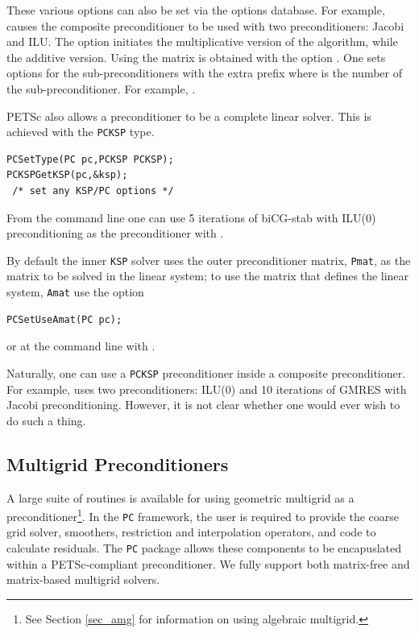 These various options can also be set via the options database. For example,
    
 causes the composite preconditioner to be used with
two preconditioners: Jacobi and ILU. The option  
 initiates the multiplicative version of the algorithm,
while   the additive version. Using the 
matrix is obtained with the option .
 One sets options for the sub-preconditioners with the
extra prefix  where  is the number of the sub-preconditioner.
For example,  .

PETSc also allows a preconditioner to be a complete linear solver. This is
achieved with the \lstinline{PCKSP} type.
\begin{lstlisting}
PCSetType(PC pc,PCKSP PCKSP);
PCKSPGetKSP(pc,&ksp);
 /* set any KSP/PC options */
\end{lstlisting}
From the command line one can use 5 iterations of
biCG-stab with ILU(0) preconditioning as the preconditioner with
.

By default the inner \lstinline{KSP} solver uses the outer preconditioner matrix, \lstinline{Pmat},
as the matrix to be solved in the linear system; to use the matrix that defines the linear system, \lstinline{Amat} use the
option
\begin{lstlisting}
PCSetUseAmat(PC pc);
\end{lstlisting}
or at the command line with . 

Naturally, one can use a \lstinline{PCKSP} preconditioner inside a composite preconditioner. For example,
uses two preconditioners: ILU(0) and 10 iterations of GMRES with Jacobi preconditioning.
However, it is not clear whether one would ever wish to do such a thing.

\subsection{Multigrid Preconditioners}  \label{sec_mg}

A large suite of routines is available for using geometric multigrid as a
preconditioner\footnote{See Section \ref{sec_amg} for information on using algebraic multigrid.}.
In the \lstinline{PC} framework, the user is required to provide
the coarse grid solver, smoothers, restriction and interpolation operators,
and code to calculate residuals. The \lstinline{PC} package
allows these components to be encapuslated within a PETSc-compliant preconditioner.
We fully support both matrix-free and matrix-based multigrid solvers.

